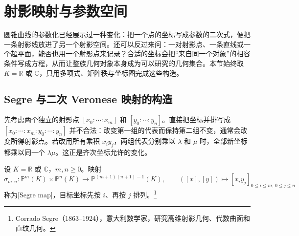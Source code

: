 
% 
% 
% 

\section{射影映射与参数空间}
\label{g1:sec:0206}

圆锥曲线的参数化已经展示过一种变化：把一个点的坐标写成参数的二次式，便把一条射影线放进了另一个射影空间。还可以反过来问：一对射影点、一条直线或一个超平面，能否也用一个射影点来记录？合适的坐标会把“来自同一个对象”的相容条件写成方程，从而让整族几何对象本身成为可以研究的几何集合。本节始终取 \(K=\mathbb R\) 或 \(\mathbb C\)，只用多项式、矩阵秩与坐标图完成这些构造。

\subsection{Segre 与二次 Veronese 映射的构造}
\label{g1:subsec:0206:01}

先考虑两个独立的射影点 \([x_0:\cdots:x_m]\) 和 \([y_0:\cdots:y_n]\)。直接把坐标并排写成 \([x_0:\cdots:x_m:y_0:\cdots:y_n]\) 并不合法：改变第一组的代表而保持第二组不变，通常会改变所得射影点。若改用所有乘积 \(x_i y_j\)，两组代表分别乘以 \(\lambda\) 和 \(\mu\) 时，全部新坐标都乘以同一个 \(\lambda\mu\)。这正是齐次坐标允许的变化。

\begin{definition}[Segre 映射]\label{g1:def:segre-map}
	设 \(K=\mathbb R\) 或 \(\mathbb C\)，\(m,n\ge0\)。映射
	\[
		\sigma_{m,n}:\mathbb P^m(K)\times\mathbb P^n(K)
		\longrightarrow\mathbb P^{(m+1)(n+1)-1}(K),\qquad
		([x],[y])\longmapsto[x_i y_j]_{0\le i\le m,\,0\le j\le n}
	\]
	称为[Segre map]，目标坐标先按 \(i\)、再按 \(j\) 排列。\footnote{Corrado Segre（1863--1924），意大利数学家，研究高维射影几何、代数曲面和直纹几何。}
\end{definition}

